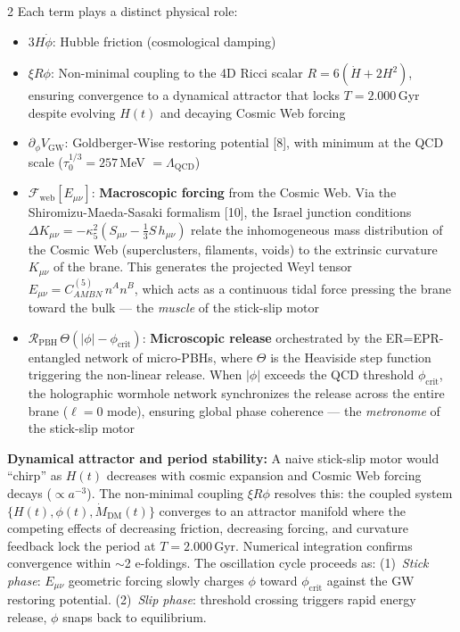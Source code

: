 \documentclass[11pt]{article}
\begin{document}
\begin{multicols}{2}
Each term plays a distinct physical role:
\begin{itemize}
\item $3H\dot{\phi}$: Hubble friction (cosmological damping)
\item $\xi R\phi$: Non-minimal coupling to the 4D Ricci scalar $R = 6(\dot{H} + 2H^2)$, ensuring convergence to a dynamical attractor that locks $T = 2.000$\,Gyr despite evolving $H(t)$ and decaying Cosmic Web forcing
\item $\partial_\phi V_\text{GW}$: Goldberger-Wise restoring potential [8], with minimum at the QCD scale ($\tau_0^{1/3} = 257$\,MeV $= \Lambda_\text{QCD}$)
\item $\mathcal{F}_\text{web}[E_{\mu\nu}]$: \textbf{Macroscopic forcing} from the Cosmic Web. Via the Shiromizu-Maeda-Sasaki formalism [10], the Israel junction conditions $\Delta K_{\mu\nu} = -\kappa_5^2(S_{\mu\nu} - \frac{1}{3}S\,h_{\mu\nu})$ relate the inhomogeneous mass distribution of the Cosmic Web (superclusters, filaments, voids) to the extrinsic curvature $K_{\mu\nu}$ of the brane. This generates the projected Weyl tensor $E_{\mu\nu} = C^{(5)}_{AMBN}\,n^A n^B$, which acts as a continuous tidal force pressing the brane toward the bulk --- the \textit{muscle} of the stick-slip motor
\item $\mathcal{R}_\text{PBH}\,\Theta(|\phi| - \phi_\text{crit})$: \textbf{Microscopic release} orchestrated by the ER=EPR-entangled network of micro-PBHs, where $\Theta$ is the Heaviside step function triggering the non-linear release. When $|\phi|$ exceeds the QCD threshold $\phi_\text{crit}$, the holographic wormhole network synchronizes the release across the entire brane ($\ell=0$ mode), ensuring global phase coherence --- the \textit{metronome} of the stick-slip motor
\end{itemize}

\textbf{Dynamical attractor and period stability:} A naive stick-slip motor would ``chirp'' as $H(t)$ decreases with cosmic expansion and Cosmic Web forcing decays ($\propto a^{-3}$). The non-minimal coupling $\xi R\phi$ resolves this: the coupled system $\{H(t), \phi(t), \dot{M}_\text{DM}(t)\}$ converges to an attractor manifold where the competing effects of decreasing friction, decreasing forcing, and curvature feedback lock the period at $T = 2.000$\,Gyr. Numerical integration confirms convergence within $\sim$2 e-foldings. The oscillation cycle proceeds as: (1)~\textit{Stick phase}: $E_{\mu\nu}$ geometric forcing slowly charges $\phi$ toward $\phi_\text{crit}$ against the GW restoring potential. (2)~\textit{Slip phase}: threshold crossing triggers rapid energy release, $\phi$ snaps back to equilibrium.


\end{multicols}
\end{document}
